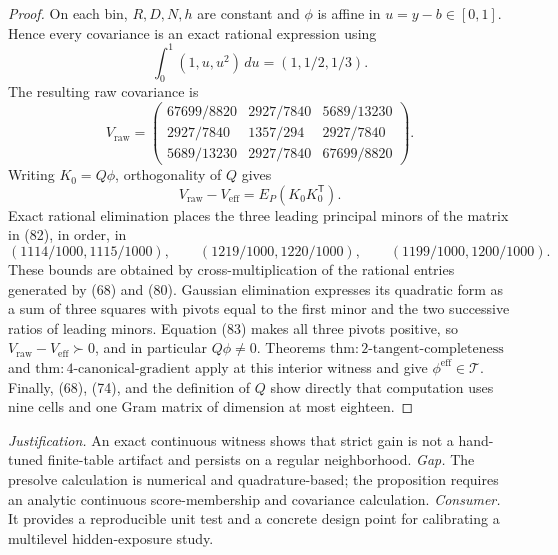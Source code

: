 \documentclass{article}
\begin{document}
\begin{proof}
On each bin, \(R,D,N,h\) are constant and \(\phi\) is affine in \(u=y-b\in[0,1]\).  Hence every covariance is an exact rational expression using
\[
 \int_0^1(1,u,u^2)\,du=(1,1/2,1/3). \tag{80}
\]
The resulting raw covariance is
\[
 V_{\mathrm{raw}}=
 \begin{pmatrix}
 67699/8820&2927/7840&5689/13230\\
 2927/7840&1357/294&2927/7840\\
 5689/13230&2927/7840&67699/8820
 \end{pmatrix}. \tag{81}
\]
Writing \(K_0=Q\phi\), orthogonality of \(Q\) gives
\[
 V_{\mathrm{raw}}-V_{\mathrm{eff}}=E_P(K_0K_0^{\mathsf T}). \tag{82}
\]
Exact rational elimination places the three leading principal minors of the matrix in (82), in order, in
\[
 (1114/1000,1115/1000),\qquad
 (1219/1000,1220/1000),\qquad
 (1199/1000,1200/1000). \tag{83}
\]
These bounds are obtained by cross-multiplication of the rational entries generated by (68) and (80).  Gaussian elimination expresses its quadratic form as a sum of three squares with pivots equal to the first minor and the two successive ratios of leading minors.  Equation (83) makes all three pivots positive, so \(V_{\mathrm{raw}}-V_{\mathrm{eff}}\succ0\), and in particular \(Q\phi\ne0\).  Theorems \(\mathrm{thm{:}2\mbox{-}tangent\mbox{-}completeness}\) and \(\mathrm{thm{:}4\mbox{-}canonical\mbox{-}gradient}\) apply at this interior witness and give \(\phi^{\mathrm{eff}}\in\mathcal T\).  Finally, (68), (74), and the definition of \(Q\) show directly that computation uses nine cells and one Gram matrix of dimension at most eighteen.
\end{proof}
\par\smallskip\noindent \textit{Justification.} An exact continuous witness shows that strict gain is not a hand-tuned finite-table artifact and persists on a regular neighborhood. \textit{Gap.} The presolve calculation is numerical and quadrature-based; the proposition requires an analytic continuous score-membership and covariance calculation. \textit{Consumer.} It provides a reproducible unit test and a concrete design point for calibrating a multilevel hidden-exposure study.
\end{document}
